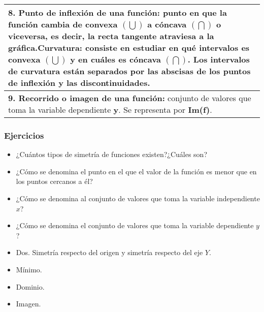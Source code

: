 \begin{table}[]
\begin{tabular}{|p{5cm}|}
		\textbf{8. Punto de inflexión de una función:} punto en que la función cambia de convexa $(\bigcup)$ a cóncava $(\bigcap)$ o viceversa, es decir, la recta tangente atraviesa a la gráfica.\newline \textbf{Curvatura:} consiste en estudiar en qué intervalos es convexa $(\bigcup)$ y en cuáles es cóncava $(\bigcap)$. Los intervalos de curvatura están separados por las abscisas de los puntos de inflexión y las discontinuidades.\\ \hline
		\textbf{9. Recorrido o imagen de una función:} conjunto de valores que toma la variable dependiente \textbf{y}. Se representa por \textbf{Im(f)}.\\ \hline
	\end{tabular}
	
\end{table}


\subsubsection{Ejercicios}

\begin{ex}
	\begin{itemize}
		\item ¿Cuántos tipos de simetría de funciones existen?¿Cuáles son?
		\item ¿Cómo se denomina el punto en el que el valor de la función es menor que en los puntos cercanos a él?
		\item ¿Cómo se denomina al conjunto de valores que toma la variable independiente $x$?
		\item ¿Cómo se denomina el conjunto de valores que toma la variable dependiente $y$?
	\end{itemize}
	\begin{sol}
		\begin{itemize}
			\item Dos. Simetría respecto del origen y simetría respecto del eje $Y$.
			\item Mínimo.
			\item Dominio.
			\item Imagen.
		\end{itemize}
	\end{sol}
\end{ex}
